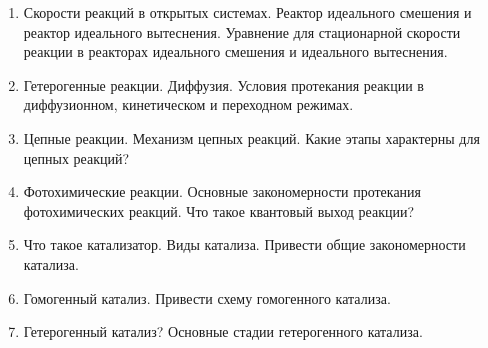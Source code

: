 \begin{enumerate}
\item 
Скорости реакций в открытых системах. Реактор идеального смешения и реактор идеального вытеснения. Уравнение для стационарной скорости реакции в реакторах идеального смешения и идеального вытеснения.
 
\item
Гетерогенные реакции. Диффузия. Условия протекания реакции в диффузионном, кинетическом и переходном режимах.
 
\item
Цепные реакции. Механизм цепных реакций. Какие этапы характерны для цепных реакций?
 
\item
Фотохимические реакции. Основные закономерности протекания фотохимических реакций. Что такое квантовый выход реакции?
 
\item
Что такое катализатор. Виды катализа. Привести общие закономерности катализа.
 
\item
Гомогенный катализ. Привести схему гомогенного катализа.
 
\item
Гетерогенный катализ? Основные стадии гетерогенного катализа.
\end{enumerate}